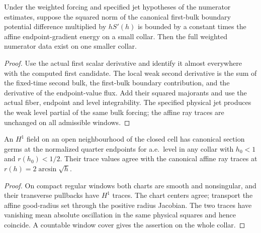 \begin{lemma}
\label{lem:weighted-numerator-assembly}
\leanok
Under the weighted forcing and specified jet hypotheses of the numerator
estimates, suppose the squared norm of the canonical first-bulk boundary
potential difference multiplied by $hS'(h)$ is bounded by a constant
times the affine endpoint-gradient energy on a small collar.
Then the full weighted numerator data exist on one smaller collar.
\end{lemma}
\begin{proof}
\leanok
Use the actual first scalar derivative and identify it almost everywhere
with the computed first candidate. The local weak second derivative is the
sum of the fixed-time second bulk, the first-bulk boundary contribution,
and the derivative of the endpoint-value flux. Add their squared
majorants and use the actual fiber, endpoint and level integrability.
The specified physical jet produces the weak level partial of the same
bulk forcing; the affine ray traces are unchanged on all admissible windows.
\end{proof}

\begin{lemma}
\label{lem:quarter-endpoint-trace-comparison}
\leanok
An $H^1$ field on an open neighbourhood of the closed cell has canonical
section germs at the normalized quarter endpoints for a.e.\ level in any
collar with $h_0<1$ and $r(h_0)<1/2$. Their trace values agree with the
canonical affine ray traces at $r(h)=2\arcsin\sqrt h$.
\end{lemma}
\begin{proof}
\leanok
On compact regular windows both charts are smooth and nonsingular, and
their transverse pullbacks have $H^1$ traces. The chart centers agree;
transport the affine good-radius set through the positive radius
Jacobian. The two traces have vanishing mean absolute oscillation in
the same physical squares and hence coincide. A countable window
cover gives the assertion on the whole collar.
\end{proof}

